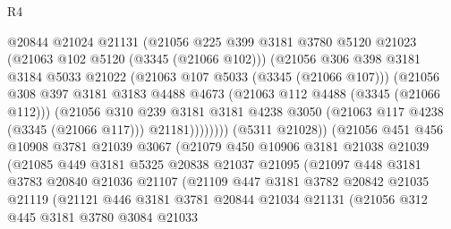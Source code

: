 \begin{lexlean}{R4}
\begin{coremodule}
                      @20844
                      @21024
                      @21131
                      (@21056
                        @225
                        @399
                        @3181
                        @3780
                        @5120
                        @21023
                        (@21063 @102 @5120 (@3345 (@21066 @102)))
                        (@21056
                          @306
                          @398
                          @3181
                          @3184
                          @5033
                          @21022
                          (@21063 @107 @5033 (@3345 (@21066 @107)))
                          (@21056
                            @308
                            @397
                            @3181
                            @3183
                            @4488
                            @4673
                            (@21063 @112 @4488 (@3345 (@21066 @112)))
                            (@21056
                              @310
                              @239
                              @3181
                              @3181
                              @4238
                              @3050
                              (@21063 @117 @4238 (@3345 (@21066 @117)))
                              @21181))))))))
              (@5311 @21028))
            (@21056
              @451
              @456
              @10908
              @3781
              @21039
              @3067
              (@21079
                @450
                @10906
                @3181
                @21038
                @21039
                (@21085
                  @449
                  @3181
                  @5325
                  @20838
                  @21037
                  @21095
                  (@21097
                    @448
                    @3181
                    @3783
                    @20840
                    @21036
                    @21107
                    (@21109
                      @447
                      @3181
                      @3782
                      @20842
                      @21035
                      @21119
                      (@21121
                        @446
                        @3181
                        @3781
                        @20844
                        @21034
                        @21131
                        (@21056
                          @312
                          @445
                          @3181
                          @3780
                          @3084
                          @21033

\end{coremodule}
\end{lexlean}
